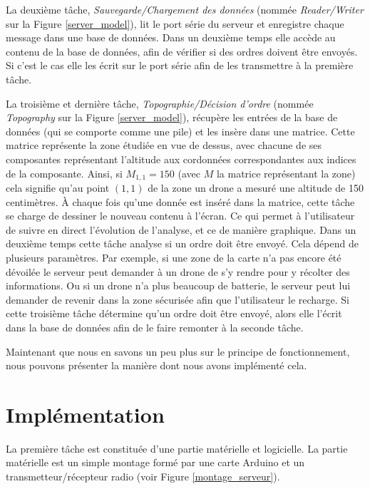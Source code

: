 \documentclass[a4paper,10pt]{report}
\begin{document}
	La deuxième tâche, \textit{Sauvegarde/Chargement des données} (nommée 
\textit{Reader/Writer} sur la Figure \ref{server_model}), lit le port série du 
serveur et enregistre chaque message dans une base de données. Dans un deuxième 
temps elle accède au contenu de la base de données, afin de vérifier si des 
ordres doivent être envoyés. Si c'est le cas elle les écrit sur le port série 
afin de les transmettre à la première tâche.

	La troisième et dernière tâche, \textit{Topographie/Décision d'ordre} 
(nommée \textit{Topography} sur la Figure \ref{server_model}), récupère les 
entrées de la base de données (qui se comporte comme une pile) et les insère 
dans une matrice. Cette matrice représente la zone étudiée en vue de dessus, 
avec chacune de ses composantes représentant l'altitude aux cordonnées 
correspondantes aux indices de la composante. Ainsi, si $M_{1, 1} = 150$ (avec 
$M$ la matrice représentant la zone) cela signifie qu'au point $(1, 1)$ de la 
zone un drone a mesuré une altitude de 150 centimètres. À chaque fois 
qu'une donnée est inséré dans la matrice, cette tâche se charge de dessiner 
le nouveau contenu à l'écran. Ce qui permet à l'utilisateur de suivre en 
direct l'évolution de l'analyse, et ce de manière graphique. Dans un deuxième 
temps cette tâche analyse si un ordre doit être envoyé. Cela dépend de 
plusieurs paramètres. Par exemple, si une zone de la carte n'a pas encore été 
dévoilée le serveur peut demander à un drone de s'y rendre pour y récolter des 
informations. Ou si un drone n'a plus beaucoup de batterie, le serveur peut lui 
demander de revenir dans la zone sécurisée afin que l'utilisateur le recharge. 
Si cette troisième tâche détermine qu'un ordre doit être envoyé, alors elle 
l'écrit dans la base de données afin de le faire remonter à la seconde tâche.

	Maintenant que nous en savons un peu plus sur le principe de 
fonctionnement, nous pouvons présenter la manière dont nous avons implémenté 
cela.
    
    \section{Implémentation}
      La première tâche est constituée d'une partie matérielle et logicielle. 
La partie matérielle est un simple montage formé par une carte Arduino et un 
transmetteur/récepteur radio (voir Figure \ref{montage_serveur}).
\end{document}
